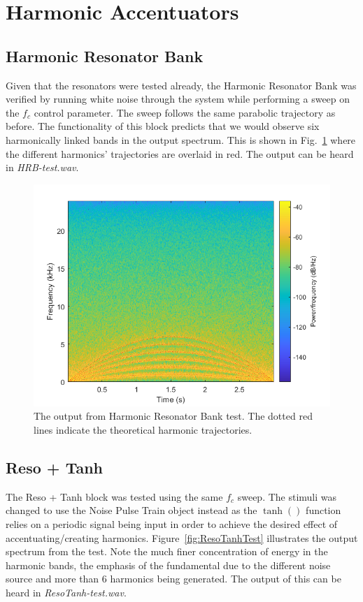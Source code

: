\documentclass[../main.tex]{subfiles}
\begin{document}
\section{Harmonic Accentuators}
\subsection{Harmonic Resonator Bank}
Given that the resonators were tested already, the Harmonic Resonator Bank was verified by running white noise through the system while performing a sweep on the $f_c$ control parameter. The sweep follows the same parabolic trajectory as before. The functionality of this block predicts that we would observe six harmonically linked bands in the output spectrum. This is shown in Fig.~\ref{fig:HRBTest} where the different harmonics' trajectories are overlaid in red. The output can be heard in \emph{HRB-test.wav}.

\begin{figure}[h]
    \centering
    \includegraphics[scale=.65]{./images/plots/HRBTest.png}
    \caption{The output from Harmonic Resonator Bank test. The dotted red lines indicate the theoretical harmonic trajectories.}
    \label{fig:HRBTest}
\end{figure}

\subsection{Reso + Tanh}
The Reso + Tanh block was tested using the same $f_c$ sweep. The stimuli was changed to use the Noise Pulse Train object instead as the $\tanh()$ function relies on a periodic signal being input in order to achieve the desired effect of accentuating/creating harmonics. Figure~\ref{fig:ResoTanhTest} illustrates the output spectrum from the test. Note the much finer concentration of energy in the harmonic bands, the emphasis of the fundamental due to the different noise source and more than 6 harmonics being generated. The output of this can be heard in \emph{ResoTanh-test.wav}.
\end{document}
